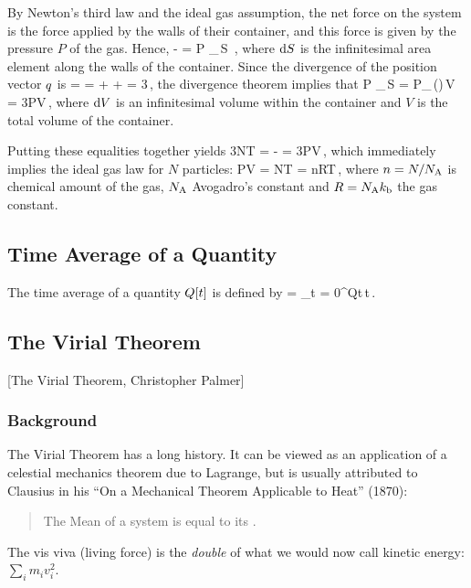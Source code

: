 By Newton's third law and the ideal gas assumption, the net force on the system is the force applied by the walls of their container, and this force is given by the pressure $P$ of the gas. Hence,
\beq
- = P \oint_{}\,\gpvec\iprod\dx S \,,
\eeq
where $\text{d} S$ is the infinitesimal area element along the walls of the container. Since the divergence of the position vector $q$ is
\beq
\div\gpvec = \gder\iprod\gpvec =  +  +  = 3\,,
\eeq
the divergence theorem implies that
\beq
P \oint_{}\,\gpvec\iprod\dx S = P\int_{}\,(\gder\iprod\gpvec)\,\dx V = 3PV\,,
\eeq
where $\text{d} V$ is an infinitesimal volume within the container and $V$ is the total volume of the container.

Putting these equalities together yields
\beq
3N\boltz T = - = 3PV\,,
\eeq
which immediately implies the ideal gas law for $N$ particles:
\beq
PV = N\boltz T = nRT\,,
\eeq
where $n = N/N_\text{A}$ is chemical amount of the gas, $N_\text{A}$ Avogadro's constant and $R = N_\text{A}k_\text{b}$ the gas constant.


\subsection{Time Average of a Quantity}
The time average of a quantity $Q\!\left[{t}\right]$ is defined by
\beq
{} = \int_{t = 0}^{\tau}Q\vat t\,\dx t\,.
\eeq


\subsection{The Virial Theorem}

[The Virial Theorem, Christopher Palmer]

\subsubsection{Background}
The Virial Theorem has a long history. It can be viewed as an application of a celestial mechanics theorem due to Lagrange, but is usually attributed to Clausius in his ``On a Mechanical Theorem Applicable to Heat'' (1870):
\begin{quote}
The Mean  of a system is equal to its .
\end{quote}

The vis viva (living force) is the \emph{double} of what we would now call kinetic energy: $\sum_i m_i v_i^2$.

